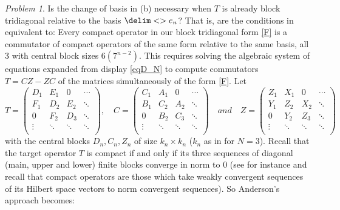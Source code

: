 \documentclass[10pt,reqno]{amsart}
\theoremstyle{remark}
\newtheorem{problem}[theorem]{Problem}
\newcommand{\seq}{\delim<>}
\numberwithin{equation}{section}
\begin{document}
\begin{problem}
  Is the change of basis in (b) necessary when $T$ is already block tridiagonal relative to the basis $\seq{e_n}$?
  That is, are the conditions in  equivalent to: Every compact operator in our block tridiagonal form  \eqref{F} is a commutator of compact operators of the same form relative to the same basis, all 3 with central block sizes  $6 (7^{n-2})$.
  This requires solving the algebraic system of equations expanded from display \eqref{eqD_N} to compute commutators $T = CZ-ZC$ of the matrices simultaneously of the form \eqref{F}.
  Let
  \begin{equation}
    \label{TDF4.8}
    T = \begin{pmatrix}
      D_1 &  E_1  &0   & \cdots        \\
      F_1 & D_2&E_2  &  \ddots            \\
      0 &F_2 &D_3 & \ddots             \\
      \vdots &\ddots &\ddots  &\ddots  \\
    \end{pmatrix}, \quad
    C = \begin{pmatrix}
      C_1 &  A_1  &0   & \cdots        \\
      B_1 & C_2&A_2  &  \ddots            \\
      0 &B_2 &C_3 & \ddots             \\
      \vdots &\ddots &\ddots  &\ddots  \\
    \end{pmatrix} \quad and \quad
    Z = \begin{pmatrix}
      Z_1 & X _1  &0   & \cdots        \\
      Y_1 & Z_2&X_2  &  \ddots            \\
      0 &Y_2 &Z_3 & \ddots             \\
      \vdots &\ddots &\ddots  &\ddots  \\
    \end{pmatrix}
  \end{equation}
  with the central blocks $D_n, C_n, Z_n$ of size $k_n\times k_n$ ($k_n$ as in  for $N=3$).
  Recall that the target operator $T$ is compact if and only if its three sequences of diagonal (main, upper and lower) finite blocks converge in norm to 0 (see for instance  and recall that compact operators are those which take weakly convergent sequences of its Hilbert space vectors to norm convergent sequences).
  So Anderson's approach becomes:

\end{problem}
\end{document}
